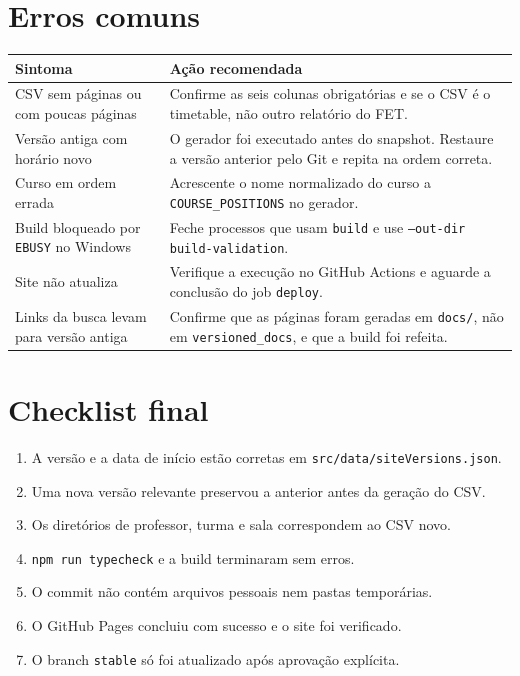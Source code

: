 \documentclass[11pt,a4paper]{article}
\begin{document}
\section{Erros comuns}
\begin{longtable}{p{}p{}}
\toprule
Sintoma & Ação recomendada \\
\midrule
CSV sem páginas ou com poucas páginas & Confirme as seis colunas obrigatórias e se o CSV é o timetable, não outro relatório do FET. \\
Versão antiga com horário novo & O gerador foi executado antes do snapshot. Restaure a versão anterior pelo Git e repita na ordem correta. \\
Curso em ordem errada & Acrescente o nome normalizado do curso a \texttt{COURSE\_POSITIONS} no gerador. \\
Build bloqueado por \texttt{EBUSY} no Windows & Feche processos que usam \texttt{build} e use \texttt{--out-dir build-validation}. \\
Site não atualiza & Verifique a execução no GitHub Actions e aguarde a conclusão do job \texttt{deploy}. \\
Links da busca levam para versão antiga & Confirme que as páginas foram geradas em \texttt{docs/}, não em \texttt{versioned\_docs}, e que a build foi refeita. \\
\bottomrule
\end{longtable}

\section{Checklist final}
\begin{enumerate}[leftmargin=*]
  \item A versão e a data de início estão corretas em \texttt{src/data/siteVersions.json}.
  \item Uma nova versão relevante preservou a anterior antes da geração do CSV.
  \item Os diretórios de professor, turma e sala correspondem ao CSV novo.
  \item \texttt{npm run typecheck} e a build terminaram sem erros.
  \item O commit não contém arquivos pessoais nem pastas temporárias.
  \item O GitHub Pages concluiu com sucesso e o site foi verificado.
  \item O branch \texttt{stable} só foi atualizado após aprovação explícita.
\end{enumerate}
\end{document}
